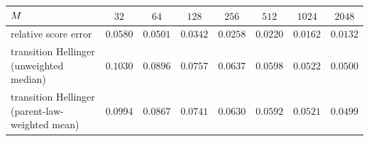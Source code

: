 
\begin{center}\small
\begin{tabular}{@{}lccccccc@{}}
\toprule
$M$ & $32$ & $64$ & $128$ & $256$ & $512$ & $1024$ & $2048$ \\
\midrule
relative score error & $0.0580$ & $0.0501$ & $0.0342$ & $0.0258$ & $0.0220$ & $0.0162$ & $0.0132$ \\
transition Hellinger (unweighted median) & $0.1030$ & $0.0896$ & $0.0757$ & $0.0637$ & $0.0598$ & $0.0522$ & $0.0500$ \\
transition Hellinger (parent-law-weighted mean) & $0.0994$ & $0.0867$ & $0.0741$ & $0.0630$ & $0.0592$ & $0.0521$ & $0.0499$ \\
\bottomrule
\end{tabular}
\end{center}
